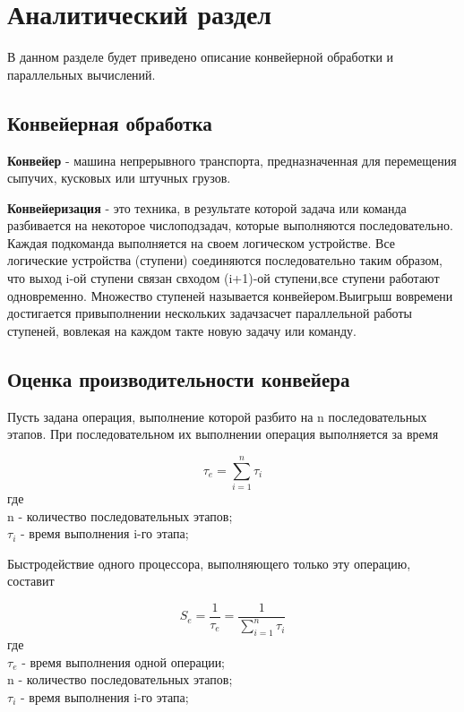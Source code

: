 \chapter{Аналитический раздел}
\label{cha:analysis}

В данном разделе будет приведено описание
конвейерной обработки и параллельных вычислений.

\section{Конвейерная обработка}

\textbf{Конвейер} - машина непрерывного транспорта, предназначенная для
перемещения сыпучих, кусковых или штучных грузов.

\textbf{Конвейеризация} - это техника, в результате которой задача или команда разбивается на некоторое числоподзадач, которые  выполняются последовательно.
Каждая подкоманда выполняется на своем логическом устройстве. Все логические устройства (ступени) соединяются последовательно таким образом, что выход i-ой ступени связан свходом (i+1)-ой ступени,все ступени работают одновременно.
Множество ступеней называется конвейером.Выигрыш вовремени достигается привыполнении нескольких задачзасчет параллельной работы ступеней, вовлекая на каждом такте новую задачу или команду.


\section{Оценка производительности конвейера}


Пусть задана операция, выполнение которой разбито на n последовательных этапов. При последовательном их выполнении операция выполняется за время

\begin{equation}
    \label{eq:1.1}
    \tau_{e}={\sum\limits_{i=1}^n \tau_{i}}
\end{equation}
где \\
n - количество последовательных этапов; \\
$\tau_{i}$ - время выполнения i-го этапа;

Быстродействие одного процессора, выполняющего только эту операцию, составит

\begin{equation}\label{eq:1.2}
    S_{e}={\frac{1}{\tau_{e}}}={\frac{1}{\sum\limits_{i=1}^n \tau_{i}}}
\end{equation}
где \\
$\tau_{e}$ - время выполнения одной операции; \\
n - количество последовательных этапов; \\
$\tau_{i}$ - время выполнения i-го этапа;

